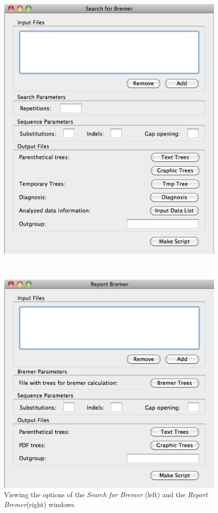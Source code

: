 {\begin{figure}
\centering
\begin{minipage}[c]{0.45\textwidth}
   		\includegraphics[width=\textwidth]{doc/figures/searchforbremer_window.jpg}
\end{minipage}
\,
\begin{minipage}[c]{0.52\textwidth}
	   	\includegraphics[width=\textwidth]{doc/figures/reportbremer_window.jpg}
   	\end{minipage}
\caption{Viewing the options of the \emph{Search for Bremer} (left) and the \emph{Report Bremer}(right) windows.}
\label{fig:search_report_bremer}
\end{figure}

}
